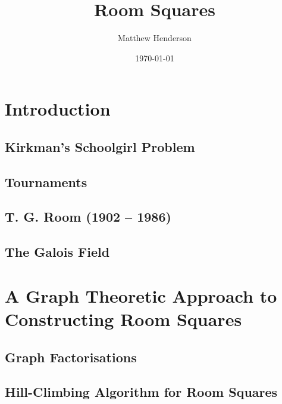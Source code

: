 \documentclass[a4paper, draft]{book}
\title{Room Squares}
\author{Matthew Henderson}
\date{\today}
\begin{document}
\frontmatter
\maketitle
\tableofcontents

\mainmatter

\chapter{Introduction}
\label{ch:introduction}

\section{Kirkman’s Schoolgirl Problem}
  
\section{Tournaments}
  
\section{T. G. Room (1902 -- 1986)}
  
\section{The Galois Field}
  

\chapter{A Graph Theoretic Approach to Constructing Room Squares}
\label{ch:graph-theoretic}

\section{Graph Factorisations}
  
\section{Hill-Climbing Algorithm for Room Squares}
  






\backmatter
\printbibliography[title=References]
\end{document}
